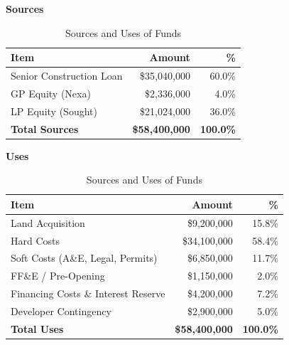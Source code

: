 \begin{table}[H]
\centering
\caption{Sources and Uses of Funds}
\label{tab:sourcesuses}
\vspace{4pt}
\begin{minipage}[t]{0.48\linewidth}
\centering
\small\textbf{Sources}
\vspace{3pt}

\begin{tabularx}{\linewidth}{X r r}
\toprule
\rowcolor{jvnavy}
\textbf{\color{white}Item} & \textbf{\color{white}Amount} & \textbf{\color{white}\%} \\
\midrule
Senior Construction Loan & \$35,040,000 & 60.0\% \\
\rowcolor{jvcream}
GP Equity (Nexa) & \$2,336,000 & 4.0\% \\
LP Equity (Sought) & \$21,024,000 & 36.0\% \\
\midrule
\textbf{Total Sources} & \textbf{\$58,400,000} & \textbf{100.0\%} \\
\bottomrule
\end{tabularx}
\end{minipage}%
\hfill
\begin{minipage}[t]{0.48\linewidth}
\centering
\small\textbf{Uses}
\vspace{3pt}

\begin{tabularx}{\linewidth}{X r r}
\toprule
\rowcolor{jvnavy}
\textbf{\color{white}Item} & \textbf{\color{white}Amount} & \textbf{\color{white}\%} \\
\midrule
Land Acquisition & \$9,200,000 & 15.8\% \\
\rowcolor{jvcream}
Hard Costs & \$34,100,000 & 58.4\% \\
Soft Costs (A\&E, Legal, Permits) & \$6,850,000 & 11.7\% \\
\rowcolor{jvcream}
FF\&E / Pre-Opening & \$1,150,000 & 2.0\% \\
Financing Costs \& Interest Reserve & \$4,200,000 & 7.2\% \\
\rowcolor{jvcream}
Developer Contingency & \$2,900,000 & 5.0\% \\
\midrule
\textbf{Total Uses} & \textbf{\$58,400,000} & \textbf{100.0\%} \\
\bottomrule
\end{tabularx}
\end{minipage}
\end{table}
\par

